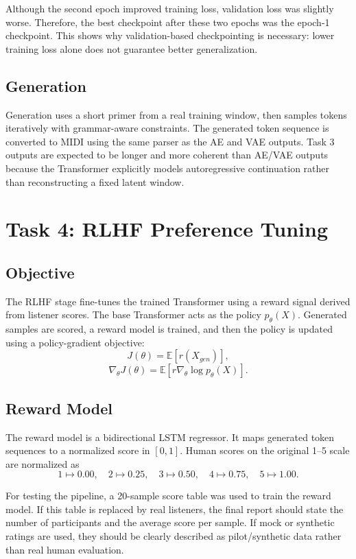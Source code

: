 \documentclass{article}
\begin{document}
Although the second epoch improved training loss, validation loss was slightly worse. Therefore, the best checkpoint after these two epochs was the epoch-1 checkpoint. This shows why validation-based checkpointing is necessary: lower training loss alone does not guarantee better generalization.

\subsection{Generation}
Generation uses a short primer from a real training window, then samples tokens iteratively with grammar-aware constraints. The generated token sequence is converted to MIDI using the same parser as the AE and VAE outputs. Task 3 outputs are expected to be longer and more coherent than AE/VAE outputs because the Transformer explicitly models autoregressive continuation rather than reconstructing a fixed latent window.

\section{Task 4: RLHF Preference Tuning}

\subsection{Objective}
The RLHF stage fine-tunes the trained Transformer using a reward signal derived from listener scores. The base Transformer acts as the policy \(p_{\theta}(X)\). Generated samples are scored, a reward model is trained, and then the policy is updated using a policy-gradient objective:
\[
J(\theta) = \mathbb{E}[r(X_{gen})],
\]
\[
\nabla_{\theta} J(\theta) = \mathbb{E}[r \nabla_{\theta} \log p_{\theta}(X)].
\]

\subsection{Reward Model}
The reward model is a bidirectional LSTM regressor. It maps generated token sequences to a normalized score in \([0,1]\). Human scores on the original 1--5 scale are normalized as
\[
1 \mapsto 0.00, \quad 2 \mapsto 0.25, \quad 3 \mapsto 0.50, \quad 4 \mapsto 0.75, \quad 5 \mapsto 1.00.
\]

For testing the pipeline, a 20-sample score table was used to train the reward model. If this table is replaced by real listeners, the final report should state the number of participants and the average score per sample. If mock or synthetic ratings are used, they should be clearly described as pilot/synthetic data rather than real human evaluation.
\end{document}
